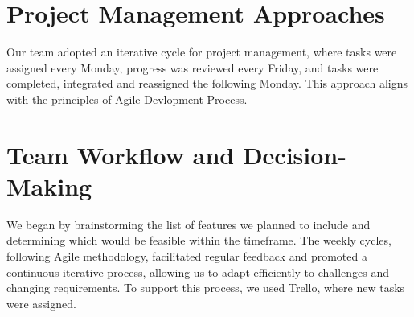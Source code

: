 \section{Project Management Approaches}
\label{sect: Project Management Approaches}
\begin{length}
    Our team adopted an iterative cycle for project management, where tasks were assigned every Monday, progress was reviewed every Friday, and tasks were completed, integrated and reassigned the following Monday. This approach aligns with the principles of Agile Devlopment Process.
\end{length}

\section{Team Workflow and Decision-Making}
\label{sect: Team Workflow and Decision-Making}
\begin{length}
    We began by brainstorming the list of features we planned to include and determining which would be feasible within the timeframe. The weekly cycles, following Agile methodology, facilitated regular feedback and promoted a continuous iterative process, allowing us to adapt efficiently to challenges and changing requirements. To support this process, we used Trello, where new tasks were assigned.
\end{length}

